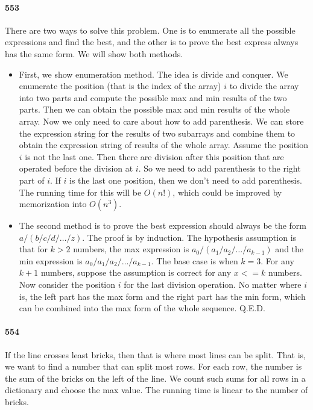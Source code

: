 \documentclass[11pt]{article}
\begin{document}
\paragraph{553}
There are two ways to solve this problem. One is to enumerate all the possible expressions and find the best, and the other
is to prove the best express always has the same form. We will show both methods.
\begin{itemize}
\item First, we show enumeration method. The idea is divide and conquer. We enumerate the position (that is the index of the array) 
$i$ to divide the array into two parts and compute the possible
max and min results of the two parts. Then we can obtain the possible max and min results of the whole array. Now we only need
to care about how to add parenthesis. We can store the expression string for the results of two subarrays and combine them 
to obtain the expression string of results of the whole array. Assume the position $i$ is not the last one. Then there are
division after this position that are operated before the division at $i$. So we need to add parenthesis to the right part of
$i$. If $i$ is the last one position, then we don't need to add parenthesis. The running time for this will be $O(n!)$, which
could be improved by memorization into $O(n^3)$.

\item The second method is to prove the best expression should always be the form $a / (b / c / d / \dots / z)$.
The proof is by induction. The hypothesis assumption is that for $k>2$ numbers, the max expression is $a_0 / (a_1 / a_2 / \dots
/ a_{k-1})$ and the min expression is $a_0 / a_1 / a_2 / \dots / a_{k-1}$.
The base case is when $k = 3$. For any $k+1$ numbers, suppose the assumption is correct for any $x <= k$ numbers. Now consider the
position $i$ for the last division operation. No matter where $i$ is, the left part has the max form and the right part has the 
min form, which can be combined into the max form of the whole sequence. Q.E.D.
\end{itemize}


\paragraph{554}
If the line crosses least bricks, then that is where most lines can be split. That is, we want to find a number that can split
most rows. For each row, the number is the sum of the bricks on the left of the line. We count such sums for all rows in 
a dictionary and choose the max value. The running time is linear to the number of bricks.
\end{document}
